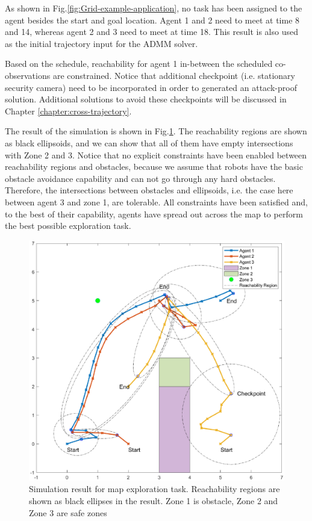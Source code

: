 \documentclass[journal]{IEEEtran}  %
\begin{document}
As shown in Fig.\ref{fig:Grid-example-application}, no task has been assigned to the agent besides the start and goal location. Agent 1 and 2 need to meet at time 8 and 14, whereas agent 2 and 3 need to meet at time 18. This result is also used as the initial trajectory input for the ADMM solver. 

Based on the schedule, reachability for agent 1 in-between the scheduled co-observations are constrained. Notice that additional checkpoint (i.e. stationary security camera) need to be incorporated in order to generated an attack-proof solution. Additional solutions to avoid these checkpoints will be discussed in Chapter \ref{chapter:cross-trajectory}.  

The result of the simulation is shown in Fig.\ref{fig:ReachabilitySimulation}. The reachability regions are shown as black ellipsoids, and we can show that all of them have empty intersections with Zone 2 and 3. Notice that no explicit constraints have been enabled between reachability regions and obstacles, because we assume that robots have the basic obstacle avoidance capability and can not go through any hard obstacles. Therefore, the intersections between obstacles and ellipsoids, i.e. the case here between agent 3 and zone 1, are tolerable. All constraints have been satisfied and, to the best of their capability, agents have spread out across the map to perform the best possible exploration task. 

\begin{figure}[htbp]
\begin{center}
\includegraphics[width=0.6\linewidth]{FinalResult}
\caption{Simulation result for map exploration task. Reachability regions are shown as black ellipses in the result. Zone 1 is obstacle, Zone 2 and Zone 3 are safe zones}
\label{fig:ReachabilitySimulation}
\end{center}
\end{figure}
\end{document}
